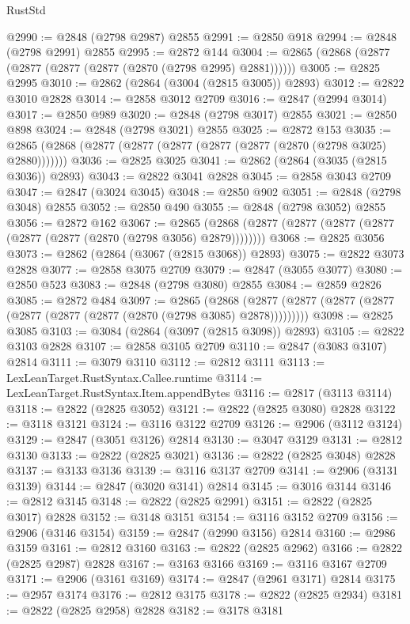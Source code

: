 \begin{lexlean}{RustStd}
\begin{coremodule}
@2990 := @2848 (@2798 @2987) @2855
@2991 := @2850 @918
@2994 := @2848 (@2798 @2991) @2855
@2995 := @2872 @144
@3004 := @2865 (@2868 (@2877 (@2877 (@2877 (@2877 (@2870 (@2798 @2995) @2881))))))
@3005 := @2825 @2995
@3010 := @2862 (@2864 (@3004 (@2815 @3005)) @2893)
@3012 := @2822 @3010 @2828
@3014 := @2858 @3012 @2709
@3016 := @2847 (@2994 @3014)
@3017 := @2850 @989
@3020 := @2848 (@2798 @3017) @2855
@3021 := @2850 @898
@3024 := @2848 (@2798 @3021) @2855
@3025 := @2872 @153
@3035 := @2865 (@2868 (@2877 (@2877 (@2877 (@2877 (@2877 (@2870 (@2798 @3025) @2880)))))))
@3036 := @2825 @3025
@3041 := @2862 (@2864 (@3035 (@2815 @3036)) @2893)
@3043 := @2822 @3041 @2828
@3045 := @2858 @3043 @2709
@3047 := @2847 (@3024 @3045)
@3048 := @2850 @902
@3051 := @2848 (@2798 @3048) @2855
@3052 := @2850 @490
@3055 := @2848 (@2798 @3052) @2855
@3056 := @2872 @162
@3067 := @2865 (@2868 (@2877 (@2877 (@2877 (@2877 (@2877 (@2877 (@2870 (@2798 @3056) @2879))))))))
@3068 := @2825 @3056
@3073 := @2862 (@2864 (@3067 (@2815 @3068)) @2893)
@3075 := @2822 @3073 @2828
@3077 := @2858 @3075 @2709
@3079 := @2847 (@3055 @3077)
@3080 := @2850 @523
@3083 := @2848 (@2798 @3080) @2855
@3084 := @2859 @2826
@3085 := @2872 @484
@3097 := @2865
    (@2868 (@2877 (@2877 (@2877 (@2877 (@2877 (@2877 (@2877 (@2870 (@2798 @3085) @2878)))))))))
@3098 := @2825 @3085
@3103 := @3084 (@2864 (@3097 (@2815 @3098)) @2893)
@3105 := @2822 @3103 @2828
@3107 := @2858 @3105 @2709
@3110 := @2847 (@3083 @3107) @2814
@3111 := @3079 @3110
@3112 := @2812 @3111
@3113 := LexLeanTarget.RustSyntax.Callee.runtime
@3114 := LexLeanTarget.RustSyntax.Item.appendBytes
@3116 := @2817 (@3113 @3114)
@3118 := @2822 (@2825 @3052)
@3121 := @2822 (@2825 @3080) @2828
@3122 := @3118 @3121
@3124 := @3116 @3122 @2709
@3126 := @2906 (@3112 @3124)
@3129 := @2847 (@3051 @3126) @2814
@3130 := @3047 @3129
@3131 := @2812 @3130
@3133 := @2822 (@2825 @3021)
@3136 := @2822 (@2825 @3048) @2828
@3137 := @3133 @3136
@3139 := @3116 @3137 @2709
@3141 := @2906 (@3131 @3139)
@3144 := @2847 (@3020 @3141) @2814
@3145 := @3016 @3144
@3146 := @2812 @3145
@3148 := @2822 (@2825 @2991)
@3151 := @2822 (@2825 @3017) @2828
@3152 := @3148 @3151
@3154 := @3116 @3152 @2709
@3156 := @2906 (@3146 @3154)
@3159 := @2847 (@2990 @3156) @2814
@3160 := @2986 @3159
@3161 := @2812 @3160
@3163 := @2822 (@2825 @2962)
@3166 := @2822 (@2825 @2987) @2828
@3167 := @3163 @3166
@3169 := @3116 @3167 @2709
@3171 := @2906 (@3161 @3169)
@3174 := @2847 (@2961 @3171) @2814
@3175 := @2957 @3174
@3176 := @2812 @3175
@3178 := @2822 (@2825 @2934)
@3181 := @2822 (@2825 @2958) @2828
@3182 := @3178 @3181

\end{coremodule}
\end{lexlean}
